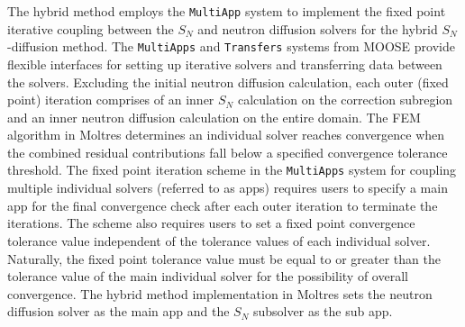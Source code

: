The hybrid method employs the \texttt{MultiApp} system \cite{gaston_physics-based_2015} to
implement the fixed point iterative coupling between the $S_N$ and neutron diffusion solvers for
the hybrid $S_N$-diffusion method.
The \texttt{MultiApps} and \texttt{Transfers} systems from \gls{MOOSE} provide flexible interfaces
for setting up iterative solvers and transferring data between the solvers.
Excluding the initial neutron diffusion calculation,
each outer (fixed point) iteration comprises of an inner $S_N$ calculation on the correction
subregion and an inner neutron diffusion calculation on the entire domain. The \gls{FEM} algorithm
in Moltres determines an individual solver reaches convergence when the combined
residual contributions fall below a specified convergence tolerance threshold. The fixed point
iteration scheme in the \texttt{MultiApps} system for coupling multiple individual
solvers (referred to as apps) requires users to specify a main app for the final convergence check
after each outer iteration to terminate the iterations. The scheme also requires users to set a
fixed point convergence tolerance value independent of the tolerance values of each individual
solver. Naturally, the fixed point tolerance value must be equal to or greater than the tolerance
value of the main individual solver for the possibility of overall convergence. The hybrid method
implementation in Moltres sets the neutron diffusion solver as the main app and the $S_N$ subsolver
as the sub app.

